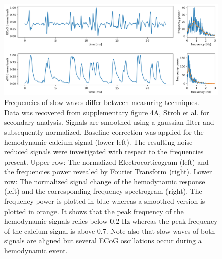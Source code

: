 \begin{figure}[!htb]
\centering
\includegraphics[width=\textwidth,height=\textheight,keepaspectratio]{Figures/ECoG_calcium_flourescence}
\decoRule
\caption[Frequencies of slow waves differ between measuring techniques]{Frequencies of slow waves differ between measuring techniques.\\
Data was recovered from supplementary figure 4A, Stroh et al. \parencite*{stroh2013making} for secondary analysis. Signals are smoothed using a gaussian filter and subsequently normalized. Baseline correction was applied for the hemodynamic calcium signal (lower left). The resulting noise reduced signals were investigated with respect to the frequencies present. Upper row: The normalized Electrocorticogram (left) and the frequencies power revealed by Fourier Transform (right). Lower row: The normalized signal change of the hemodynamic response (left) and the corresponding frequency spectrogram (right). The frequency power is plotted in blue whereas a smoothed version is plotted in orange. It shows that the peak frequency of the hemodynamic signals relies below 0.2 Hz whereas the peak frequency of the calcium signal is above 0.7. Note also that slow waves of both signals are aligned but several ECoG oscillations occur during a hemodynamic event.\\
}
\label{fig:ECoG_calcium_flourescence}
\end{figure}
